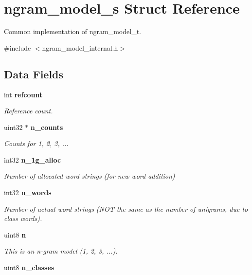 \section{ngram\+\_\+model\+\_\+s Struct Reference}
\label{structngram__model__s}


Common implementation of ngram\+\_\+model\+\_\+t.  




{\ttfamily \#include $<$ngram\+\_\+model\+\_\+internal.\+h$>$}

\subsection*{Data Fields}
\begin{DoxyCompactItemize}
\item 
int {\bf refcount}\label{structngram__model__s_a3b14986e4dc40ccec1f7e206b7f41d06}

\begin{DoxyCompactList}\small\item\em Reference count. \end{DoxyCompactList}\item 
uint32 $\ast$ {\bf n\+\_\+counts}
\begin{DoxyCompactList}\small\item\em Counts for 1, 2, 3, ... \end{DoxyCompactList}\item 
int32 {\bf n\+\_\+1g\+\_\+alloc}\label{structngram__model__s_a3e41109b30668bdfc077614c1ef49960}

\begin{DoxyCompactList}\small\item\em Number of allocated word strings (for new word addition) \end{DoxyCompactList}\item 
int32 {\bf n\+\_\+words}
\begin{DoxyCompactList}\small\item\em Number of actual word strings (N\+O\+T the same as the number of unigrams, due to class words). \end{DoxyCompactList}\item 
uint8 {\bf n}
\begin{DoxyCompactList}\small\item\em This is an n-\/gram model (1, 2, 3, ...). \end{DoxyCompactList}\item 
uint8 {\bf n\+\_\+classes}\label{structngram__model__s_adeb914f8e9f011a5c960f5ee9cd33919}


\end{DoxyCompactItemize}
